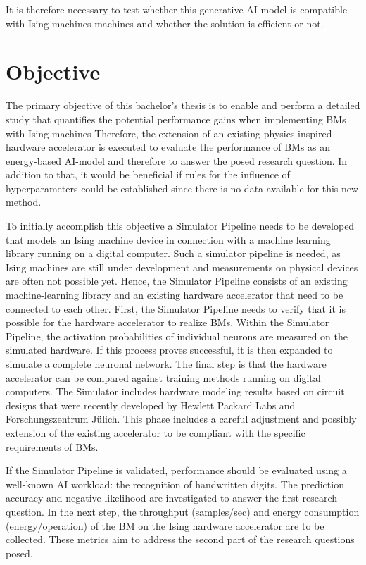 It is therefore necessary to test whether this generative AI model is compatible with Ising machines
machines and whether the solution is efficient or not.


\section{Objective}

The primary objective of this bachelor's thesis is to
enable and perform a detailed study that quantifies the potential performance gains when implementing \ac{BM}s with Ising machines
Therefore, the extension of an existing physics-inspired
hardware accelerator is executed to evaluate the performance of \ac{BM}s as an energy-based 
AI-model and therefore to answer the posed research question. 
In addition to that, it would be beneficial if rules for the influence of hyperparameters could be established
since there is no data available for this new method.

To initially accomplish this objective a Simulator Pipeline needs to be developed that models an Ising machine device in connection with a machine learning library running on a digital computer.
Such a simulator pipeline is needed, as Ising machines are still under development and measurements on physical devices are often not possible yet.
Hence, the Simulator Pipeline consists of an existing machine-learning library and an existing hardware accelerator
that need to be connected to each other.
First, the Simulator Pipeline needs to verify that it is possible for the hardware accelerator
to realize \ac{BM}s. 
Within the Simulator Pipeline, the activation probabilities of individual neurons are measured on the simulated hardware.
If this process proves successful, it is then expanded to simulate a complete neuronal network.
The final step is that the hardware accelerator can be compared against training methods running on digital computers.
The Simulator includes hardware modeling results based on circuit designs that were recently developed by Hewlett Packard Labs and Forschungszentrum Jülich.
This phase includes a careful adjustment and possibly extension of the existing accelerator to be compliant 
with the specific requirements of \ac{BM}s.

If the Simulator Pipeline is validated, performance should be evaluated using a well-known AI workload: the recognition of handwritten digits.
The prediction accuracy and negative likelihood are investigated to answer the first research question.
In the next step, the throughput (samples/sec) and energy consumption (energy/operation) of the \ac{BM} on the Ising hardware accelerator are to be collected.
These metrics aim to address the second part of the research questions posed.


